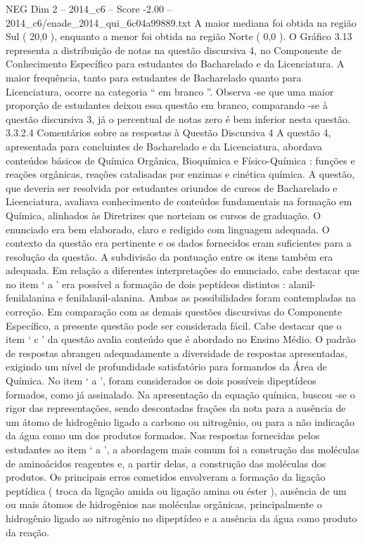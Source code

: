 \begin{textsample}{NEG Dim 2 – 2014\_c6 – Score -2.00 – 2014\_c6/enade\_2014\_qui\_6c04a99889.txt}
A maior mediana foi obtida na região Sul ( 20,0 ), enquanto a menor foi obtida na região Norte ( 0,0 ).
O Gráfico 3.13 representa a distribuição de notas na questão discursiva 4, no Componente de Conhecimento Específico para estudantes do Bacharelado e da Licenciatura.
A maior frequência, tanto para estudantes de Bacharelado quanto para Licenciatura, ocorre na categoria “ em branco ”.
Observa -se que uma maior proporção de estudantes deixou essa questão em branco, comparando -se à questão discursiva 3, já o percentual de notas zero é bem inferior nesta questão. 3.3.2.4 Comentários sobre as respostas à Questão Discursiva 4 A questão 4, apresentada para concluintes de Bacharelado e da Licenciatura, abordava conteúdos básicos de Química Orgânica, Bioquímica e Físico-Química : funções e reações orgânicas, reações catalisadas por enzimas e cinética química.
A questão, que deveria ser resolvida por estudantes oriundos de cursos de Bacharelado e Licenciatura, avaliava conhecimento de conteúdos fundamentais na formação em Química, alinhados às Diretrizes que norteiam os cursos de graduação.
O enunciado era bem elaborado, claro e redigido com linguagem adequada.
O contexto da questão era pertinente e os dados fornecidos eram suficientes para a resolução da questão.
A subdivisão da pontuação entre os itens também era adequada.
Em relação a diferentes interpretações do enunciado, cabe destacar que no item ‘ a ’ era possível a formação de dois peptídeos distintos : alanil-fenilalanina e fenilalanil-alanina.
Ambas as possibilidades foram contempladas na correção.
Em comparação com as demais questões discursivas do Componente Específico, a presente questão pode ser considerada fácil.
Cabe destacar que o item ‘ c ’ da questão avalia conteúdo que é abordado no Ensino Médio.
O padrão de respostas abrangeu adequadamente a diversidade de respostas apresentadas, exigindo um nível de profundidade satisfatório para formandos da Área de Química.
No item ‘ a ’, foram considerados os dois possíveis dipeptídeos formados, como já assinalado.
Na apresentação da equação química, buscou -se o rigor das representações, sendo descontadas frações da nota para a ausência de um átomo de hidrogênio ligado a carbono ou nitrogênio, ou para a não indicação da água como um dos produtos formados.
Nas respostas fornecidas pelos estudantes ao item ‘ a ’, a abordagem mais comum foi a construção das moléculas de aminoácidos reagentes e, a partir delas, a construção das moléculas dos produtos.
Os principais erros cometidos envolveram a formação da ligação peptídica ( troca da ligação amida ou ligação amina ou éster ), ausência de um ou mais átomos de hidrogênios nas moléculas orgânicas, principalmente o hidrogênio ligado ao nitrogênio no dipeptídeo e a ausência da água como produto da reação.

\end{textsample}
